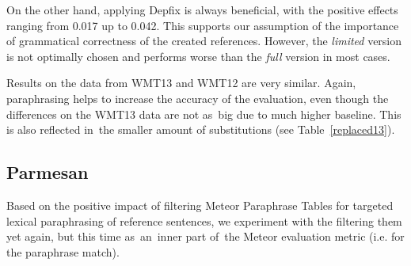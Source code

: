 \documentclass[11pt]{article}
\def\Tref#1{Table~\ref{#1}}
\begin{document}
\begin{table}[htb]
\begin{center}
\vspace{10pt}

\caption{Average number of replaced words/phrases.}
\label{replaced}
\end{center}
\end{table}

On the other hand, applying Depfix is always beneficial, with the positive 
effects ranging from 0.017 up to 0.042. This supports our assumption of the 
importance of grammatical correctness of the created references. However, the 
\textit{limited} version is not optimally chosen and performs worse than the 
\textit{full} version in most cases.

Results on the data from WMT13 and WMT12 are very similar. Again, paraphrasing 
helps to increase the accuracy of the evaluation, even though the differences 
on the WMT13 data are not as~big due to much higher baseline. This is also 
reflected in~the smaller amount of substitutions (see \Tref{replaced13}).

\subsection{Parmesan}
\label{parmesan}
Based on the positive impact of filtering Meteor Paraphrase Tables for targeted
lexical paraphrasing of reference sentences, we experiment with the filtering 
them yet again, but this time as~an~inner part of~the Meteor evaluation metric 
(i.e. for the paraphrase match).
\end{document}
